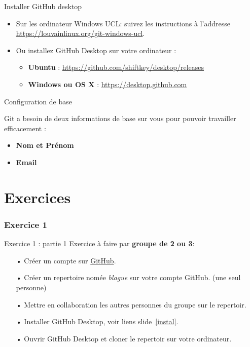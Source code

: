 \documentclass{beamer}
\begin{document}
\begin{frame}[label = {instal}]{Installer GitHub desktop}
\begin{itemize}
    \item Sur les ordinateur Windows UCL: suivez les instructions à l'addresse {\small\url{https://louvainlinux.org/git-windows-ucl}}.
    \item Ou installez GitHub Desktop sur votre ordinateur :
    \begin{itemize}
        \item \textbf{Ubuntu} : \url{https://github.com/shiftkey/desktop/releases}
        \item \textbf{Windows ou OS X} : \url{https://desktop.github.com}
    \end{itemize}
\end{itemize}
\end{frame}

\begin{frame}{Configuration de base}

Git a besoin de deux informations de base sur vous pour pouvoir travailler
efficacement :

\begin{itemize}
\item \textbf{Nom et Prénom}
\item \textbf{Email}
\end{itemize}

\end{frame}

%    


\section{Exercices}
\subsubsection{Exercice 1}
\begin{frame}{Exercice 1 : partie 1}
Exercice à faire par \textbf{groupe de 2 ou 3}:
    \begin{itemize}
    \item[•] Créer un compte sur \href{https://github.com}{GitHub}.
    \item[•] Créer un repertoire nomée \textit{blague} sur votre compte GitHub. (une seul personne)
    \item[•] Mettre en collaboration les autres personnes du groupe sur le repertoir. 
    \item[•] Installer GitHub Desktop, voir liens slide~\ref{instal}.
    \item[•] Ouvrir GitHub Desktop et cloner le repertoir sur votre ordinateur.
    \end{itemize}
\end{frame}
\end{document}
